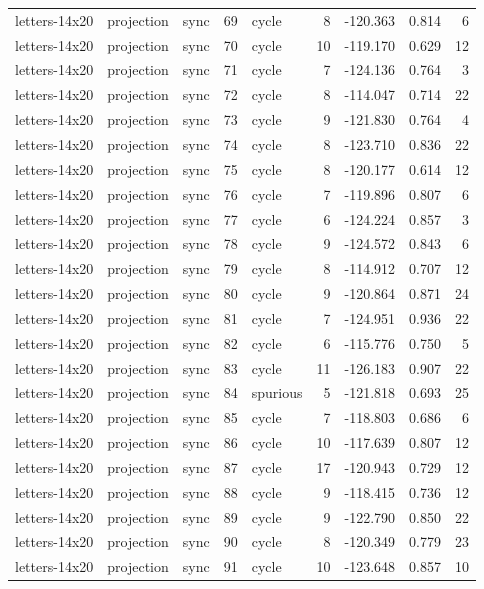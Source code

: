 \begin{tabular}{lllrlrrrr}
letters-14x20 & projection & sync & 69 & cycle & 8 & -120.363 & 0.814 & 6 \\
letters-14x20 & projection & sync & 70 & cycle & 10 & -119.170 & 0.629 & 12 \\
letters-14x20 & projection & sync & 71 & cycle & 7 & -124.136 & 0.764 & 3 \\
letters-14x20 & projection & sync & 72 & cycle & 8 & -114.047 & 0.714 & 22 \\
letters-14x20 & projection & sync & 73 & cycle & 9 & -121.830 & 0.764 & 4 \\
letters-14x20 & projection & sync & 74 & cycle & 8 & -123.710 & 0.836 & 22 \\
letters-14x20 & projection & sync & 75 & cycle & 8 & -120.177 & 0.614 & 12 \\
letters-14x20 & projection & sync & 76 & cycle & 7 & -119.896 & 0.807 & 6 \\
letters-14x20 & projection & sync & 77 & cycle & 6 & -124.224 & 0.857 & 3 \\
letters-14x20 & projection & sync & 78 & cycle & 9 & -124.572 & 0.843 & 6 \\
letters-14x20 & projection & sync & 79 & cycle & 8 & -114.912 & 0.707 & 12 \\
letters-14x20 & projection & sync & 80 & cycle & 9 & -120.864 & 0.871 & 24 \\
letters-14x20 & projection & sync & 81 & cycle & 7 & -124.951 & 0.936 & 22 \\
letters-14x20 & projection & sync & 82 & cycle & 6 & -115.776 & 0.750 & 5 \\
letters-14x20 & projection & sync & 83 & cycle & 11 & -126.183 & 0.907 & 22 \\
letters-14x20 & projection & sync & 84 & spurious & 5 & -121.818 & 0.693 & 25 \\
letters-14x20 & projection & sync & 85 & cycle & 7 & -118.803 & 0.686 & 6 \\
letters-14x20 & projection & sync & 86 & cycle & 10 & -117.639 & 0.807 & 12 \\
letters-14x20 & projection & sync & 87 & cycle & 17 & -120.943 & 0.729 & 12 \\
letters-14x20 & projection & sync & 88 & cycle & 9 & -118.415 & 0.736 & 12 \\
letters-14x20 & projection & sync & 89 & cycle & 9 & -122.790 & 0.850 & 22 \\
letters-14x20 & projection & sync & 90 & cycle & 8 & -120.349 & 0.779 & 23 \\
letters-14x20 & projection & sync & 91 & cycle & 10 & -123.648 & 0.857 & 10 \\

\end{tabular}
